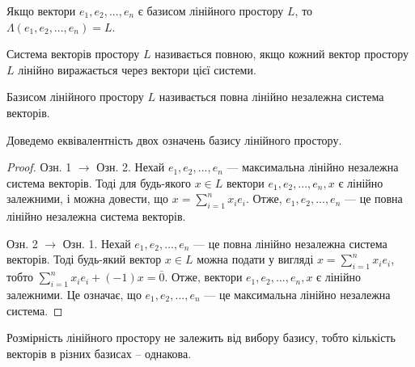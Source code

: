 \begin{claim}
	Якщо вектори $e_1, e_2, ..., e_n$ є базисом лінійного простору $L$, то
	$\Lambda(e_1, e_2, ..., e_n) = L$.
\end{claim}

\begin{definition}
	Система векторів простору $L$ називається повною, якщо кожний вектор
	простору $L$ лінійно виражається через вектори цієї системи.
\end{definition}

\begin{definition}
	Базисом лінійного простору $L$ називається повна лінійно незалежна
	система векторів.
\end{definition}

Доведемо еквівалентність двох означень базису лінійного простору.
\begin{proof}
	Озн. 1 $\rightarrow$ Озн. 2. Нехай $e_1, e_2, ..., e_n$ --- максимальна лінійно незалежна система
	векторів. Тоді для будь-якого $x \in L$ вектори $e_1, e_2, ..., e_n, x$ є лінійно залежними, і
	можна довести, що $x = \sum\limits_{i=1}^n x_ie_i$. Отже, $e_1, e_2, ..., e_n$ --- це повна
	лінійно незалежна система векторів.

	Озн. 2 $\rightarrow$ Озн. 1. Нехай $e_1, e_2, ..., e_n$ --- це повна лінійно незалежна система
	векторів. Тоді будь-який вектор $x \in L$ можна подати у вигляді $x = \sum\limits_{i=1}^n x_ie_i$, тобто
	$\sum\limits_{i=1}^n x_ie_i + (-1)x = \overline{0}$. Отже, вектори $e_1, e_2, ..., e_n, x$ є лінійно
	залежними. Це означає, що $e_1, e_2, ..., e_n$ --- це максимальна лінійно незалежна система.
\end{proof}

\begin{claim}
	Розмірність лінійного простору не залежить від вибору базису, тобто
	кількість векторів в різних базисах – однакова.
\end{claim}


